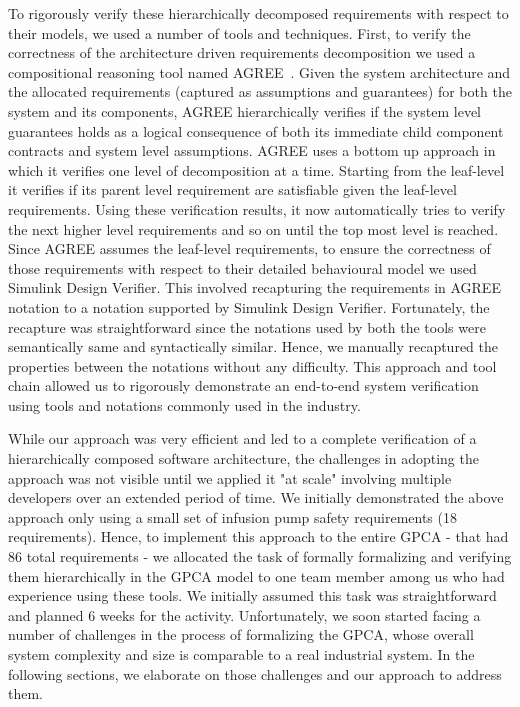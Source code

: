 To rigorously verify these hierarchically decomposed requirements with respect to their models, we used a number of tools and techniques. First, to verify the correctness of the architecture driven requirements decomposition we used a compositional reasoning tool named AGREE~\cite{NFM2012:CoGaMiWhLaLu}. Given the system architecture and the allocated requirements (captured as assumptions and guarantees) for both the system and its components, AGREE hierarchically verifies if the system level guarantees holds as a logical consequence of both its immediate child component contracts and system level assumptions. AGREE uses a bottom up approach in which it verifies one level of decomposition at a time. Starting from the leaf-level it verifies if its parent level requirement are satisfiable given the leaf-level requirements. Using these verification results, it now automatically tries to verify the next higher level requirements and so on until the top most level is reached. Since AGREE assumes the leaf-level requirements, to ensure the correctness of those requirements with respect to their detailed behavioural model we used Simulink Design Verifier. This involved recapturing the requirements in AGREE notation to a notation supported by Simulink Design Verifier. Fortunately, the recapture was straightforward since the notations used by both the tools were semantically same and syntactically similar. Hence, we manually recaptured the properties between the notations without any difficulty. This approach and tool chain allowed us to rigorously demonstrate an end-to-end system verification using tools and notations commonly used in the industry.

While our approach was very efficient and led to a complete verification of a hierarchically composed software architecture, the challenges in adopting the approach was not visible until we applied it "at scale" involving multiple developers over an extended period of time. We initially demonstrated the above approach only using a small set of infusion pump safety requirements (18 requirements). Hence, to implement this approach to the entire GPCA - that had 86 total requirements - we allocated the task of formally formalizing and verifying them hierarchically in the GPCA model to one team member among us who had experience using these tools. We initially assumed this task was straightforward and planned 6 weeks for the activity. Unfortunately, we soon started facing a number of challenges in the process of formalizing the GPCA, whose overall system complexity and size is comparable to a real industrial system. In the following sections, we elaborate on those challenges and our approach to address them. 

